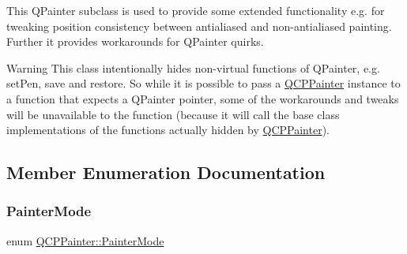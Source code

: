 This Q\+Painter subclass is used to provide some extended functionality e.\+g. for tweaking position consistency between antialiased and non-\/antialiased painting. Further it provides workarounds for Q\+Painter quirks.

\begin{DoxyWarning}{Warning}
This class intentionally hides non-\/virtual functions of Q\+Painter, e.\+g. set\+Pen, save and restore. So while it is possible to pass a \hyperlink{class_q_c_p_painter}{Q\+C\+P\+Painter} instance to a function that expects a Q\+Painter pointer, some of the workarounds and tweaks will be unavailable to the function (because it will call the base class implementations of the functions actually hidden by \hyperlink{class_q_c_p_painter}{Q\+C\+P\+Painter}). 
\end{DoxyWarning}


\subsection{Member Enumeration Documentation}
\mbox{\label{class_q_c_p_painter_a156cf16444ff5e0d81a73c615fdb156d}} 
\subsubsection{\texorpdfstring{Painter\+Mode}{PainterMode}\hspace{0.1cm}{\footnotesize\ttfamily [1/2]}}
{\footnotesize\ttfamily enum \hyperlink{class_q_c_p_painter_a156cf16444ff5e0d81a73c615fdb156d}{Q\+C\+P\+Painter\+::\+Painter\+Mode}}

